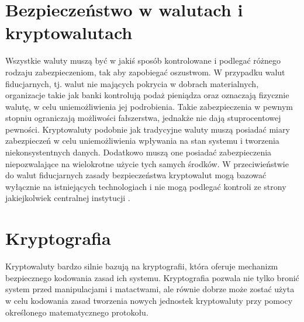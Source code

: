 \documentclass[12pt, twoside, final, openany]{mgr}
\begin{document}
\section{Bezpieczeństwo w walutach i kryptowalutach} \label{sec:bezpieczenstwoWwalutach}
\indent Wszystkie waluty muszą być w jakiś sposób kontrolowane i podlegać różnego rodzaju zabezpieczeniom, tak aby zapobiegać oszustwom. W przypadku walut fiducjarnych, tj. walut nie mających pokrycia w dobrach materialnych, organizacje takie jak banki kontrolują podaż pieniądza oraz oznaczają fizycznie walutę, w celu uniemożliwienia jej podrobienia. Takie zabezpieczenia w pewnym stopniu ograniczają możliwości fałszerstwa, jednakże nie dają stuprocentowej pewności. Kryptowaluty podobnie jak tradycyjne waluty muszą posiadać miary zabezpieczeń w celu uniemożliwienia wpływania na stan systemu i tworzenia niekonsystentnych danych. Dodatkowo muszą one posiadać zabezpieczenia niepozwalające na wielokrotne użycie tych samych środków. W przeciwieństwie do walut fiducjarnych zasady bezpieczeństwa kryptowalut mogą bazować wyłącznie na istniejących technologiach i nie mogą podlegać kontroli ze strony jakiejkolwiek centralnej instytucji \cite{elektrInstruBezEmitenta}.

\section{Kryptografia} \label{sec:kryptografia}
\indent Kryptowaluty bardzo silnie bazują na kryptografii, która oferuje mechanizm bezpiecznego kodowania zasad ich systemu. Kryptografia pozwala nie tylko bronić system przed manipulacjami i matactwami, ale równie dobrze może zostać użyta w celu kodowania zasad tworzenia nowych jednostek kryptowaluty przy pomocy określonego matematycznego protokołu\cite{Cryptocurrency}. 
\end{document}
